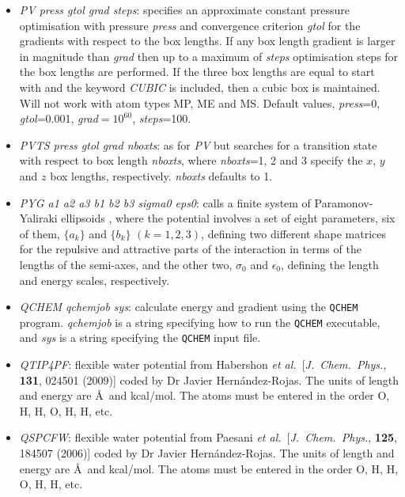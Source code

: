 \documentclass[12pt,a4paper,dvips]{article}
\begin{document}
\begin{itemize}
\item {\it PV press gtol grad steps\/}: specifies an approximate constant pressure optimisation with
pressure {\it press\/} and convergence criterion {\it gtol\/} for the gradients with
respect to the box lengths. If any box length gradient is larger in magnitude than
{\it grad\/} then up to a maximum of {\it steps\/} optimisation steps for the box lengths
are performed.
If the three box lengths are equal to start with and the keyword {\it CUBIC \/} is included,
then a cubic box is maintained. 
Will not work with atom types MP, ME and MS.
Default values, {\it press\/}=0, {\it gtol\/}=0.001, {\it grad\/}$=10^{60}$, {\it steps\/}=100.

\item {\it PVTS press gtol grad nboxts\/}: as for {\it PV\/} but searches for a transition
state with respect to box length {\it nboxts\/}, where {\it nboxts\/}=1, 2 and 3 specify the
$x$, $y$ and $z$ box lengths, respectively. {\it nboxts\/} defaults to 1.

\item {\it PYG a1 a2 a3 b1 b2 b3 sigma0 eps0\/}: calls
a finite system of Paramonov-Yaliraki ellipsoids \cite{ParamonovY05}, where the potential involves
a set of eight parameters, six of them, $\{a_{k}\}$ and $\{b_{k}\}$ $(k = 1,2,3)$, defining two
different shape matrices for the repulsive and attractive parts of the interaction in terms of the
lengths of the semi-axes, and the other two, $\sigma_{0}$ and $\epsilon_{0}$, defining the length
and energy scales, respectively.

\item {\it QCHEM qchemjob sys\/}: calculate energy and gradient using the
{\tt QCHEM} program. {\it qchemjob\/} is a string specifying how to run
the {\tt QCHEM} executable, and {\it sys\/} is a string specifying the
{\tt QCHEM} input file.

\item {\it QTIP4PF\/}: flexible water potential from  Habershon {\it et al.}~[{\it J.~Chem.~Phys.\/}, 
{\bf 131}, 024501 (2009)] coded by Dr Javier Hern\'andez-Rojas.
The units of length and energy are \AA\ and kcal/mol. The atoms must be entered in the
order O, H, H, O, H, H, etc.

\item {\it QSPCFW\/}: flexible water potential from  Paesani {\it et al.}~[{\it J.~Chem.~Phys.\/},
{\bf 125}, 184507 (2006)] coded by Dr Javier Hern\'andez-Rojas.
The units of length and energy are \AA\ and kcal/mol. The atoms must be entered in the
order O, H, H, O, H, H, etc.


\end{itemize}
\end{document}
